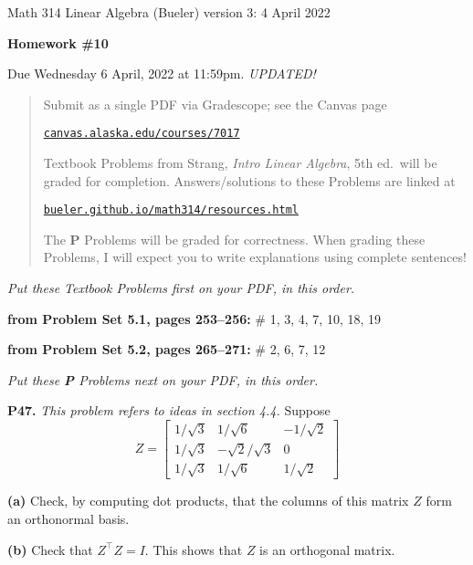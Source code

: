 \documentclass[12pt]{amsart}
\newcommand{\prob}[1]{\bigskip\noindent\textbf{#1.}\quad }
\newcommand{\probset}[2]{\bigskip\noindent\textbf{from Problem Set #1, pages #2:}\quad }
\newcommand{\epart}[1]{\medskip\noindent\textbf{(#1)}\quad }
\begin{document}
\scriptsize \noindent Math 314 Linear Algebra (Bueler) \hfill version 3: 4 April 2022
\normalsize\medskip

\Large
\centerline{\textbf{Homework \#10}}

\bigskip
\large
\centerline{Due Wednesday 6 April, 2022 at 11:59pm. \quad \emph{UPDATED!}}

\normalsize
\bigskip
\begin{quote}
\medskip
\noindent Submit as a single PDF via Gradescope; see the Canvas page

\href{https://canvas.alaska.edu/courses/7017}{\texttt{canvas.alaska.edu/courses/7017}}

\noindent Textbook Problems from Strang, \emph{Intro Linear Algebra}, 5th ed.~will be graded for completion.  Answers/solutions to these Problems are linked at

\href{https://bueler.github.io/math314/resources.html}{\texttt{bueler.github.io/math314/resources.html}}

\noindent The \textbf{P} Problems will be graded for correctness.  When grading these Problems, I will expect you to write explanations using complete sentences!
\end{quote}
\medskip

\thispagestyle{empty}

\noindent \hrulefill

\noindent \emph{Put these Textbook Problems first on your PDF, in this order.}

\probset{5.1}{253--256} \# 1, 3, 4, 7, 10, 18, 19

\probset{5.2}{265--271} \# 2, 6, 7, 12


\bigskip
\noindent \hrulefill

\noindent \emph{Put these \textbf{P} Problems next on your PDF, in this order.}

\prob{P47} \emph{This problem refers to ideas in section 4.4.} \quad Suppose
  $$Z = \begin{bmatrix} 1/\sqrt{3} & 1/\sqrt{6} & -1/\sqrt{2} \\ 1/\sqrt{3} & -\sqrt{2}/\sqrt{3} & 0 \\ 1/\sqrt{3} & 1/\sqrt{6} & 1/\sqrt{2} \end{bmatrix}$$

\epart{a}  Check, by computing dot products, that the columns of this matrix $Z$ form an orthonormal basis.

\epart{b}  Check that $Z^\top Z = I$.  This shows that $Z$ is an orthogonal matrix.
\end{document}
